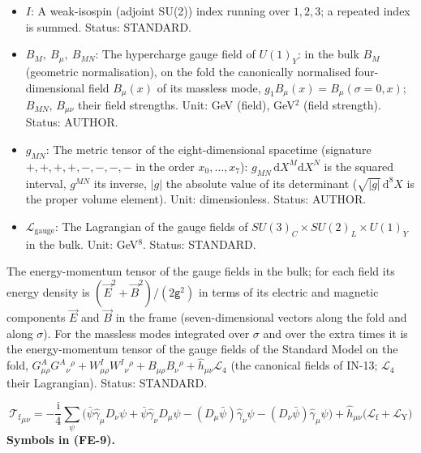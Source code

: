 \documentclass[
  10pt,
]{article}
\begin{document}
\begin{itemize}
  \(g_2W^I_\mu(x) = W^I_\mu(\sigma = 0, x)\); \(W^I_{MN}\),
  \(W^I_{\mu\nu}\) their field strengths;
  \(W^\pm_\mu = (W^1_\mu \mp \mathrm{i}W^2_\mu)/\sqrt2\). Unit: GeV
  (field), GeV\(^2\) (field strength). Status: AUTHOR.
\item
  \(I\): A weak-isospin (adjoint SU(2)) index running over \(1, 2, 3\);
  a repeated index is summed. Status: STANDARD.
\item
  \(B_M,\ B_\mu,\ B_{MN}\): The hypercharge gauge field of \(U(1)_Y\):
  in the bulk \(B_M\) (geometric normalisation), on the fold the
  canonically normalised four-dimensional field \(B_\mu(x)\) of its
  massless mode, \(g_1B_\mu(x) = B_\mu(\sigma = 0, x)\); \(B_{MN}\),
  \(B_{\mu\nu}\) their field strengths. Unit: GeV (field), GeV\(^2\)
  (field strength). Status: AUTHOR.
\item
  \(g_{MN}\): The metric tensor of the eight-dimensional spacetime
  (signature \(+,+,+,+,-,-,-,-\) in the order \(x_0, \dots, x_7\)):
  \(g_{MN}\,\mathrm{d}X^M\mathrm{d}X^N\) is the squared interval,
  \(g^{MN}\) its inverse, \(\lvert g\rvert\) the absolute value of its
  determinant (\(\sqrt{\lvert g\rvert}\,\mathrm{d}^8X\) is the proper
  volume element). Unit: dimensionless. Status: AUTHOR.
\item
  \(\mathcal{L}_{\mathrm{gauge}}\): The Lagrangian of the gauge fields
  of \(SU(3)_C\times SU(2)_L\times U(1)_Y\) in the bulk. Unit:
  GeV\(^8\). Status: STANDARD.
\end{itemize}

The energy-momentum tensor of the gauge fields in the bulk; for each
field its energy density is \((\vec E^2 + \vec B^2)/(2\mathsf{g}^2)\) in
terms of its electric and magnetic components \(\vec E\) and \(\vec B\)
in the frame (seven-dimensional vectors along the fold and along
\(\sigma\)). For the massless modes integrated over \(\sigma\) and over
the extra times it is the energy-momentum tensor of the gauge fields of
the Standard Model on the fold,
\(G^A_{\mu\rho}G^A{}_\nu{}^\rho + W^I_{\mu\rho}W^I{}_\nu{}^\rho + B_{\mu\rho}B_\nu{}^\rho + \hat h_{\mu\nu}\mathcal{L}_4\)
(the canonical fields of IN-13; \(\mathcal{L}_4\) their Lagrangian).
Status: STANDARD.

\[
{\mathcal{T}_{\mathrm{f}}}_{\mu\nu} = -\frac{\mathrm{i}}{4}\sum_\psi\Big(\bar\psi\hat\gamma_\mu D_\nu\psi + \bar\psi\hat\gamma_\nu D_\mu\psi
 - (D_\mu\bar\psi)\hat\gamma_\nu\psi - (D_\nu\bar\psi)\hat\gamma_\mu\psi\Big) + \hat h_{\mu\nu}\big(\mathcal{L}_{\mathrm{f}} + \mathcal{L}_{\mathrm{Y}}\big) \tag{FE-9}
\] \textbf{Symbols in (FE-9).}
\end{document}
